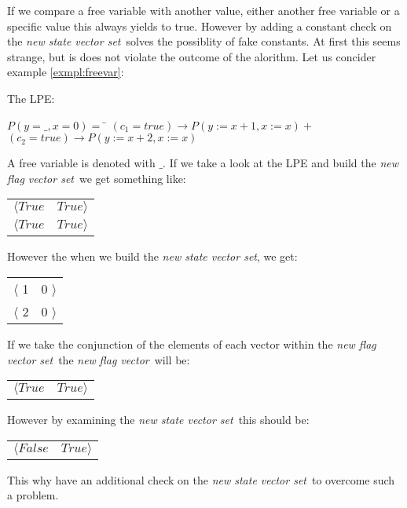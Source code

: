 \documentclass[a4paper,10pt]{article}
\newcommand{\ti}{\textit}
\newcommand{\fv}{\textit{flag vector}}
\newcommand{\svs}{\textit{new state vector set}}
\newcommand{\fvs}{\textit{new flag vector set}}
\begin{document}
If we compare a free variable with another value, either another free variable or a specific value this always yields to true. However by adding a constant check on the \svs\ solves the possiblity of fake constants. At first this seems strange, but is does not violate the outcome of the alorithm. Let us concider example \ref{exmpl:freevar}:
\begin{example}\label{exmpl:freevar} The LPE: 
\begin{tabbing}
$P(y = \_,x = 0) =$ \= $(c_1 = true) \rightarrow  P(y := x+1, x := x) + $ \\
	    \> $(c_2 = true)
 \rightarrow P(y := x+2, x := x)$
\end{tabbing}

A free variable is denoted with $\_$. If we take a look at the LPE and build the \fvs\ we get something like:
\begin{center}
\begin{tabular}{cc} 
 $\langle True $ & $ True \rangle$\\
 $\langle True $ & $ True \rangle$\\
\end{tabular} 
\end{center}

However the when we build the \svs , we get:
\begin{center}
\begin{tabular}{cc} 
 $\langle$ 1 & 0 $\rangle$\\
 $\langle$ 2 & 0 $\rangle$\\
\end{tabular}  
\end{center}

If we take the conjunction of the elements of each vector within the \fvs\ the \ti{new} \fv\ will be:
\begin{center}
\begin{tabular}{cc} 
 $\langle True $ & $ True \rangle$\\
\end{tabular}
\end{center}

However by examining the \svs\ this should be: 
\begin{center}
\begin{tabular}{cc} 
 $\langle False $ & $ True \rangle$\\
\end{tabular}
\end{center}

This why have an additional check on the \svs\ to overcome such a problem.
\end{example}
\end{document}
